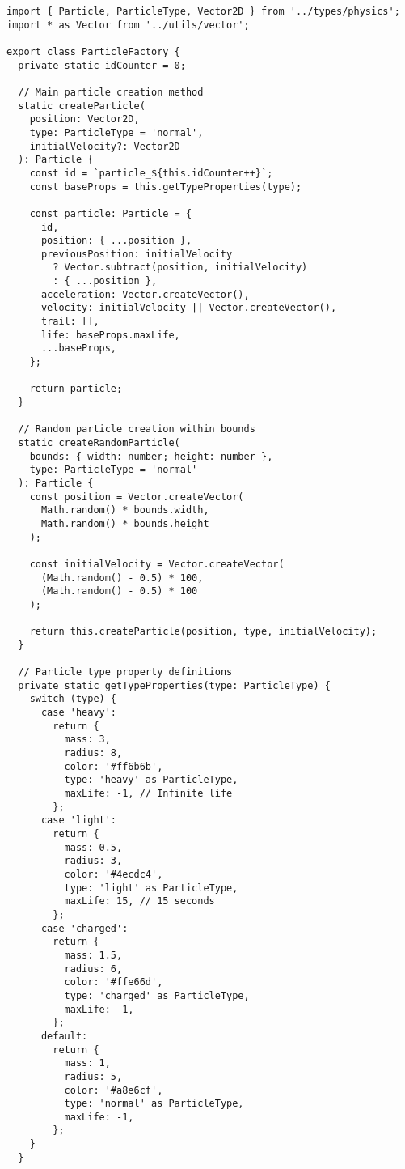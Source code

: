 \documentclass[12pt,journal,onecolumn]{IEEEtran}
\begin{document}
\begin{verbatim}
import { Particle, ParticleType, Vector2D } from '../types/physics';
import * as Vector from '../utils/vector';

export class ParticleFactory {
  private static idCounter = 0;

  // Main particle creation method
  static createParticle(
    position: Vector2D,
    type: ParticleType = 'normal',
    initialVelocity?: Vector2D
  ): Particle {
    const id = `particle_${this.idCounter++}`;
    const baseProps = this.getTypeProperties(type);
    
    const particle: Particle = {
      id,
      position: { ...position },
      previousPosition: initialVelocity 
        ? Vector.subtract(position, initialVelocity)
        : { ...position },
      acceleration: Vector.createVector(),
      velocity: initialVelocity || Vector.createVector(),
      trail: [],
      life: baseProps.maxLife,
      ...baseProps,
    };

    return particle;
  }

  // Random particle creation within bounds
  static createRandomParticle(
    bounds: { width: number; height: number },
    type: ParticleType = 'normal'
  ): Particle {
    const position = Vector.createVector(
      Math.random() * bounds.width,
      Math.random() * bounds.height
    );
    
    const initialVelocity = Vector.createVector(
      (Math.random() - 0.5) * 100,
      (Math.random() - 0.5) * 100
    );

    return this.createParticle(position, type, initialVelocity);
  }

  // Particle type property definitions
  private static getTypeProperties(type: ParticleType) {
    switch (type) {
      case 'heavy':
        return {
          mass: 3,
          radius: 8,
          color: '#ff6b6b',
          type: 'heavy' as ParticleType,
          maxLife: -1, // Infinite life
        };
      case 'light':
        return {
          mass: 0.5,
          radius: 3,
          color: '#4ecdc4',
          type: 'light' as ParticleType,
          maxLife: 15, // 15 seconds
        };
      case 'charged':
        return {
          mass: 1.5,
          radius: 6,
          color: '#ffe66d',
          type: 'charged' as ParticleType,
          maxLife: -1,
        };
      default:
        return {
          mass: 1,
          radius: 5,
          color: '#a8e6cf',
          type: 'normal' as ParticleType,
          maxLife: -1,
        };
    }
  }


\end{verbatim}
\end{document}
